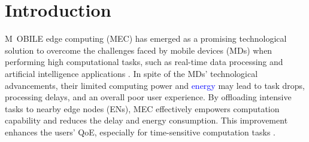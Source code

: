 \documentclass[10pt, journal,letterpaper]{IEEEtran}
\begin{document}


\section{Introduction} 

\lettrine{M}{ \,OBILE} edge computing (MEC) \cite{mao2017survey} has emerged as a promising technological solution to overcome the challenges faced by mobile devices (MDs) when performing high computational tasks, such as real-time data processing and artificial intelligence applications \cite{zhou2019edge} \cite{yousefpour2019all}. In spite of the MDs' technological advancements, their limited computing power and \textcolor{blue}{energy} may lead to task drops, processing delays, and an overall poor user experience. By offloading intensive tasks to nearby edge nodes (ENs), MEC effectively empowers computation capability and reduces the delay and energy consumption. This improvement enhances the users' QoE, especially for time-sensitive computation tasks \cite{TNSE-QOE-24} \cite{ shah2018hierarchical}. 
\end{document}
